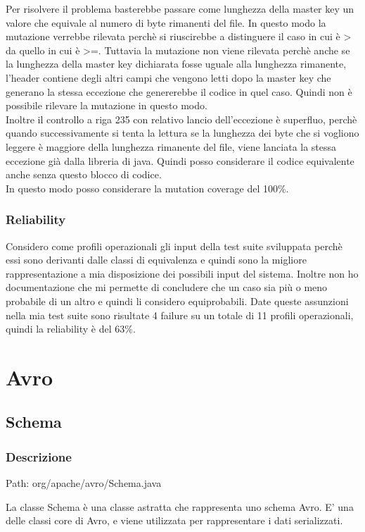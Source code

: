 \documentclass[12pt, a4paper]{article}
\begin{document}
Per risolvere il problema basterebbe passare come lunghezza della master key un valore che equivale al numero di byte rimanenti
del file. In questo modo la mutazione verrebbe rilevata perchè si riuscirebbe a distinguere il caso in cui è > da quello in cui
è >=. Tuttavia la mutazione non viene rilevata perchè anche se la lunghezza della master key dichiarata fosse uguale alla
lunghezza rimanente, l'header contiene degli altri campi che vengono letti dopo la master key che generano la stessa eccezione 
che genererebbe il codice in quel caso. Quindi non è possibile rilevare la mutazione in questo modo. \\
Inoltre il controllo a riga 235 con relativo lancio dell'eccezione è superfluo, perchè quando successivamente si tenta la lettura
se la lunghezza dei byte che si vogliono leggere è maggiore della lunghezza rimanente del file, viene lanciata la stessa eccezione
già dalla libreria di java. Quindi posso considerare il codice equivalente anche senza questo blocco di codice. \\
In questo modo posso considerare la mutation coverage del 100\%.

\subsubsection{Reliability}
Considero come profili operazionali gli input della test suite sviluppata perchè essi sono derivanti dalle classi di equivalenza
e quindi sono la migliore rappresentazione a mia disposizione dei possibili input del sistema. Inoltre non ho documentazione che
mi permette di concludere che un caso sia più o meno probabile di un altro e quindi li considero equiprobabili. Date queste 
assunzioni nella mia test suite sono risultate 4 failure su un totale di 11 profili operazionali, quindi la reliability è del 63\%.

\newpage
\section{Avro}
\subsection{Schema}
\subsubsection{Descrizione}
Path: org/apache/avro/Schema.java

La classe Schema è una classe astratta che rappresenta uno schema Avro. E' una delle classi core di Avro, e viene utilizzata
per rappresentare i dati serializzati. \\
\end{document}
